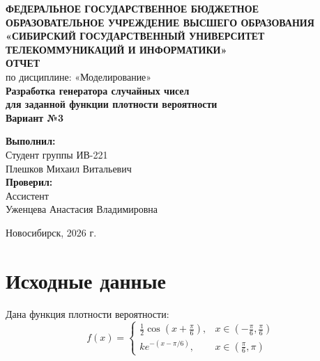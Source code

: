 \documentclass[12pt,a4paper]{article}
\date{\today}
\begin{document}
\begin{titlepage}
    \thispagestyle{empty}
    \centering
    \vspace*{1cm}
    
    {\large\textbf{ФЕДЕРАЛЬНОЕ ГОСУДАРСТВЕННОЕ БЮДЖЕТНОЕ ОБРАЗОВАТЕЛЬНОЕ УЧРЕЖДЕНИЕ ВЫСШЕГО ОБРАЗОВАНИЯ}}\\[5pt]
    {\large\textbf{«СИБИРСКИЙ ГОСУДАРСТВЕННЫЙ УНИВЕРСИТЕТ}}\\
    {\large\textbf{ТЕЛЕКОММУНИКАЦИЙ И ИНФОРМАТИКИ»}}\\[2.5cm]
    
    {\Large\textbf{ОТЧЕТ}}\\[1cm]
    {\Large по дисциплине: «Моделирование»}\\[2cm]
    
    {\Large\textbf{Разработка генератора случайных чисел\\для заданной функции плотности вероятности}}\\[1cm]
    {\Large\textbf{Вариант №3}}\\[5cm]
    
    \vspace{-2cm}
    
    \begin{flushright}
        \large
        \textbf{Выполнил:}\\
        Студент группы ИВ-221\\
        Плешков Михаил Витальевич\\[1cm]
        \textbf{Проверил:}\\
        Ассистент\\
        Уженцева Анастасия Владимировна\\[1cm]
        
    \end{flushright}
    
    \vfill
    
    {\large Новосибирск, 2026 г.}
\end{titlepage}

\tableofcontents
\newpage

\section{Исходные данные}

Дана функция плотности вероятности:
\begin{equation}
f(x) = \begin{cases} 
\displaystyle \frac{1}{2}\cos\left(x+\frac{\pi}{6}\right), & x \in \left(-\frac{\pi}{6}, \frac{\pi}{6}\right) \\[15pt]
k e^{-(x-\pi/6)}, & x \in \left(\frac{\pi}{6}, \pi\right)
\end{cases}
\end{equation}
\end{document}
